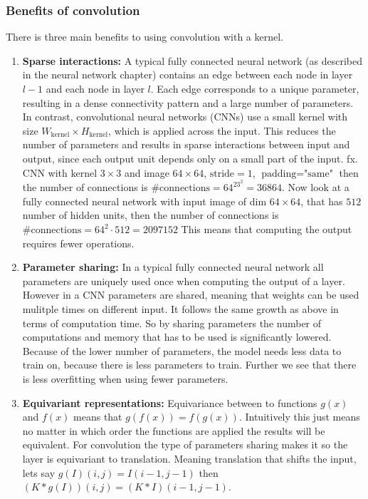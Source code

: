 \documentclass[a4paper,12pt]{article}
\begin{document}
\subsubsection{Benefits of convolution}
There is three main benefits to using convolution with a kernel. 
\begin{enumerate}
  \item \textbf{Sparse interactions:} A typical fully connected neural network (as described in the neural network chapter) contains an edge between each node in layer $l-1$ and each node in layer $l$. 
  Each edge corresponds to a unique parameter, resulting in a dense connectivity pattern and a large number of parameters. In contrast, convolutional neural networks (CNNs) use a small kernel with size $W_{\text{kernel}} \times H_{\text{kernel}}$, which is applied across the input. 
  This reduces the number of parameters and results in sparse interactions between input and output, since each output unit depends only on a small part of the input. fx. CNN with kernel $3 \times 3$ and image $64 \times 64$, $\text{stride} = 1$, $\text{padding} = \text{"same"}$ then the number of connections is $\text{\#connections} = 64^23^2 = 36864$. Now look at a fully connected neural network with input image of dim $64 \times 64$, that has  $512$ number of hidden units, then the number of connections is $\text{\#connections} = 64^2\cdot 512=2097152$
  This means that computing the output requires fewer operations.
  \item \textbf{Parameter sharing: } In a typical fully connected neural network all parameters are uniquely used once when computing the output of a layer. However in a CNN parameters are shared, meaning that weights can be used mulitple times on different input. It follows the same growth as above in terms of computation time. So by sharing parameters the number of computations and memory that has to be used is significantly lowered. Because of the lower number of parameters, the model needs less data to train on, because there is less parameters to train. Further we see that there is less overfitting when using fewer parameters.
  \item \textbf{Equivariant representations: } Equivariance between to functions $g(x)$ and $f(x)$ means that $g(f(x)) = f(g(x))$. Intuitively this just means no matter in which order the functions are applied the results will be equivalent. For convolution the type of parameters sharing makes it so the layer is equivariant to translation. Meaning translation that shifts the input, lets say $g(I)(i,j)=I(i - 1,j - 1)$ then $\left(K * g(I)\right)(i, j)=(K * I)\left(i-1, j-1\right)$.
\end{enumerate}
\end{document}
